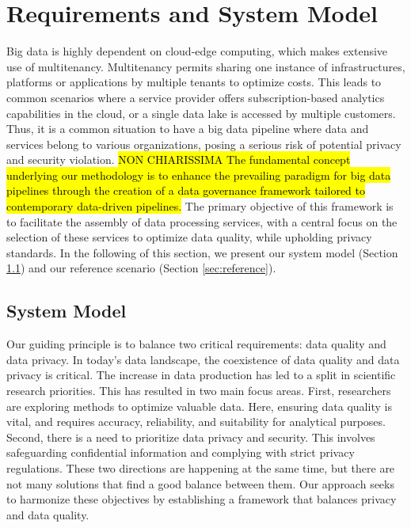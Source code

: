 \section{Requirements and System Model}\label{sec:requirements}
Big data is highly dependent on cloud-edge computing, which makes extensive use of multitenancy.
Multitenancy permits sharing one instance of infrastructures, platforms or applications by multiple tenants to optimize costs. This leads to common scenarios where a service provider offers subscription-based analytics capabilities in the cloud, or a single data lake is accessed by multiple customers. Thus, it is a common situation to have a big data pipeline where data and services belong to various organizations, posing a serious risk of potential privacy and security violation.
\hl{NON CHIARISSIMA The fundamental concept underlying our methodology is to enhance the prevailing paradigm for big data pipelines through the creation of a data governance framework tailored to contemporary data-driven pipelines.} The primary objective of this framework is to facilitate the assembly of data processing services, with a central focus on the selection of these services to optimize data quality, while upholding privacy standards. In the following of this section,
we present our system model (Section \ref{sec:systemmodel}) and our reference scenario (Section \ref{sec:reference}).

\subsection{System Model}\label{sec:systemmodel}
Our guiding principle is to balance two critical requirements: data quality and data privacy. In today's data landscape, the coexistence of data quality and data privacy is critical. The increase in data production has led to a split in scientific research priorities. This has resulted in two main focus areas. First, researchers are exploring methods to optimize valuable data. Here, ensuring data quality is vital, and requires accuracy, reliability, and suitability for analytical purposes.
Second, there is a need to prioritize data privacy and security. This involves safeguarding confidential information and complying with strict privacy regulations. These two directions are happening at the same time, but there are not many solutions that find a good balance between them.
Our approach seeks to harmonize these objectives by establishing a framework that balances privacy and data quality.

